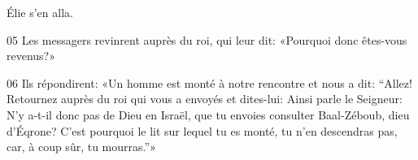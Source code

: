 Élie s’en alla.

05 Les messagers revinrent auprès du roi, qui leur dit: «Pourquoi donc êtes-vous revenus?»

06 Ils répondirent: «Un homme est monté à notre rencontre et nous a dit: “Allez! Retournez auprès du roi qui vous a envoyés et dites-lui: Ainsi parle le Seigneur: N’y a-t-il donc pas de Dieu en Israël, que tu envoies consulter Baal-Zéboub, dieu d’Éqrone? C’est pourquoi le lit sur lequel tu es monté, tu n’en descendras pas, car, à coup sûr, tu mourras.”»
